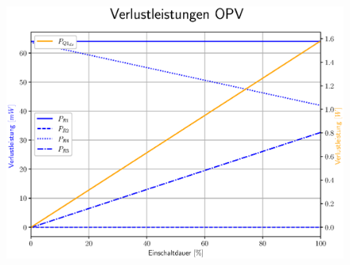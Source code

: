 \documentclass{beamer}
\begin{document}
	\begin{frame}
		\begin{center}
			\begin{figure}[tbh]
				\centering
				\includegraphics[width=0.95\linewidth]{medien/4.eps}
			\end{figure}
		\end{center}
	\end{frame}
\end{document}
